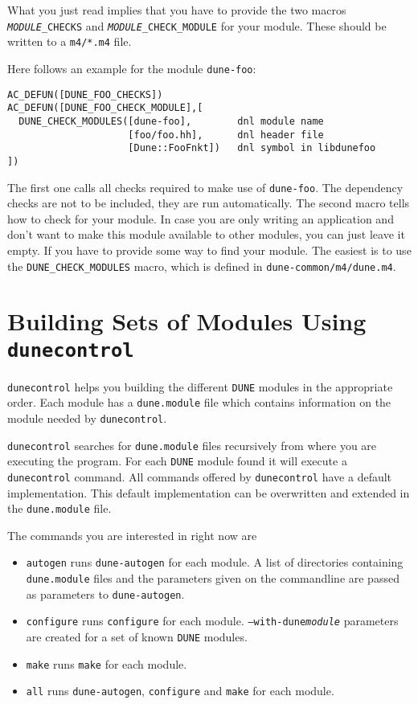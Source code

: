 \documentclass[11pt,a4paper,headinclude,footinclude,DIV16,normalheadings]{scrartcl}
\newcommand{\dune}{\texttt{DUNE}\xspace}
\newcommand{\autogen}{\texttt{dune-autogen}\xspace}
\newcommand{\configure}{\texttt{configure}\xspace}
\newcommand{\dunecontrol}{\texttt{dunecontrol}\xspace}
\newcommand{\dunemodule}{\texttt{dune.module}\xspace}
\newcommand{\make}{\texttt{make}\xspace}
\begin{document}
What you just read implies that you have to provide the two macros
\texttt{\emph{MODULE}\_CHECKS} and
\texttt{\emph{MODULE}\_CHECK\_MODULE} for your module. These should be
written to a \texttt{m4/*.m4} file.

Here follows an example for the module \texttt{dune-foo}:

\begin{lstlisting}
AC_DEFUN([DUNE_FOO_CHECKS])
AC_DEFUN([DUNE_FOO_CHECK_MODULE],[
  DUNE_CHECK_MODULES([dune-foo],        dnl module name
                     [foo/foo.hh],      dnl header file
                     [Dune::FooFnkt])   dnl symbol in libdunefoo
])
\end{lstlisting}

The first one calls all checks required to make use of
\texttt{dune-foo}. The dependency checks are not to be included, they
are run automatically. The second macro tells how to check for your
module. In case you are only writing an application and don't want to
make this module available to other modules, you can just leave it
empty. If you have to provide some way to find your module. The
easiest is to use the \texttt{DUNE\_CHECK\_MODULES} macro, which is
defined in \texttt{dune-common/m4/dune.m4}.

\section{Building Sets of Modules Using \dunecontrol}
\label{dunecontrol}
\dunecontrol helps you building the different \dune modules in the
appropriate order. Each module has a \dunemodule file which contains
information on the module needed by \dunecontrol. 

\dunecontrol searches for \dunemodule files recursively from where you
are executing the program. For each \dune module found it will execute
a \dunecontrol command. All commands offered by \dunecontrol have a
default implementation. This default implementation can be overwritten
and extended in the \dunemodule file.

The commands you are interested in right now are
\begin{itemize}
\item \texttt{autogen} runs \autogen for each module. A list of
  directories containing \dunemodule files and the parameters given on
  the commandline are passed as parameters to \autogen.
\item \texttt{configure} runs \configure for each
  module. \texttt{--with-dune\textit{module}} parameters are created
  for a set of known \dune modules.
\item \texttt{make} runs \make for each module.
\item \texttt{all} runs \autogen, \configure and \make for each module.
\end{itemize}
\end{document}
